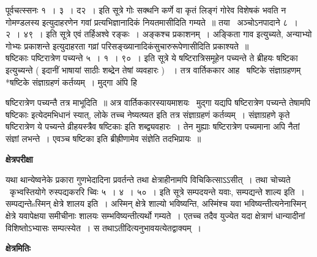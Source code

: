 \documentclass[11pt, openany]{book}
\begin{document}
पूर्वचत्स्सनः १~। ३~। द२~। इति सूत्रे {\qt गोः सक्थनि कर्णे वा कृतं लिङ्गं गोरेव विशेषकं भवति न गोमण्डलस्य} इत्युदाहरणेन गवां प्रत्यभिज्ञानादिकं नियतमासीदिति गम्यते~॥ तया \textendash\ अञ्चोऽनपादाने ८~। २~। ४९~। इति सूत्रे {\qt एवं तर्हिअश्वे रङ्कः~।} अङ्कश्च प्रकाशनम्~। अङ्किता गाव इत्युच्यते, अन्याभ्यो गोभ्यः प्रकाशन्ते इत्युदाहरता गव्रां परिसङ्ख्यानादिकंसुचारुरूपेणासीदिति प्रकाश्यते~॥\\

षष्टिकाः पष्टिरात्रेण पच्यन्ते ५~। १~। ९०~। इति सूत्रे ये षष्टिरात्रिसमूहेन पच्यन्ते ते ब्रीहयः षष्टिका इत्युच्यन्ते ( इदानीं भाषायां साठीः शब्द्रेन तेषां व्यवहारः ) ~। तत्र वार्तिककार आह \textendash\ षष्टिके संज्ञाग्रहणम् *षष्टिके संज्ञाग्रहणं कर्तव्यम्~। मुद्गा अंपि हि

\newpage

\noindent
षष्टिरात्रेण पच्यन्तै तत्र माभूदिति~॥ अत्र वार्तिककारस्यायमाशयः \textendash\ मुद्गा यद्यपि षष्टिरात्रेण पच्यन्ते तेषामपि {\qt षष्टिकाः} इत्येदमभिधानं स्यात्, लोके तच्च नेष्यत्ष्यत इति तत्र संज्ञाग्रहणं कर्तव्यम्~। संज्ञाग्रहणे कृते षष्टिरात्रेण ये पच्यन्ते व्रीहयस्त्रैव षष्टिकाः इति शब्द्व्यवहारः~। तेन मुह्याः षष्टिरात्रेण पच्यमाना अपि नैतां संज्ञां लभन्ते~। एवञ्च षष्टिका इति ब्रीह्रीणामेव संज्ञेति तदभिप्रायः~॥

\begin{center}
\textbf{\Large क्षेत्रपरीक्षा \textendash\ }
\end{center}

यथा थान्येष्वनेके प्रकारा गुणभेदादिना प्रवर्तन्ते तथा क्षेत्राहीनामपि विचिकित्साऽऽसीत्~। तथा चोच्यते \textendash\ कृभ्वस्तियोगे रुस्पद्यकररि च्विः ५~। ४~। ५०~। इति सूत्रे {\qt सम्पदयन्ते यवाः, सम्पद्यन्ते शाल्य इति~। सम्पद्यन्तेsस्मिन् क्षेत्रे शालय इति~। } अस्मिन् क्षेत्रे शाल्यो भविष्यन्ति, अस्मिंश्च यवा भविष्यन्तीत्यनेनास्मिन् क्षेत्रे यवापेक्षया समीचीनाः शालयः सम्भविष्यन्तीत्यर्थो गम्यते~। एतच्च तदैव युज्येत यदा क्षेत्राणं धान्यादीनां विशिष्तोऽभ्यासः सम्पत्स्येत~। स तथाऽतीदित्यनुभावयत्येतद्वाक्यम्~।

\begin{center}
\textbf{\Large क्षेत्रमितिः \textendash\ }
\end{center}
\end{document}
